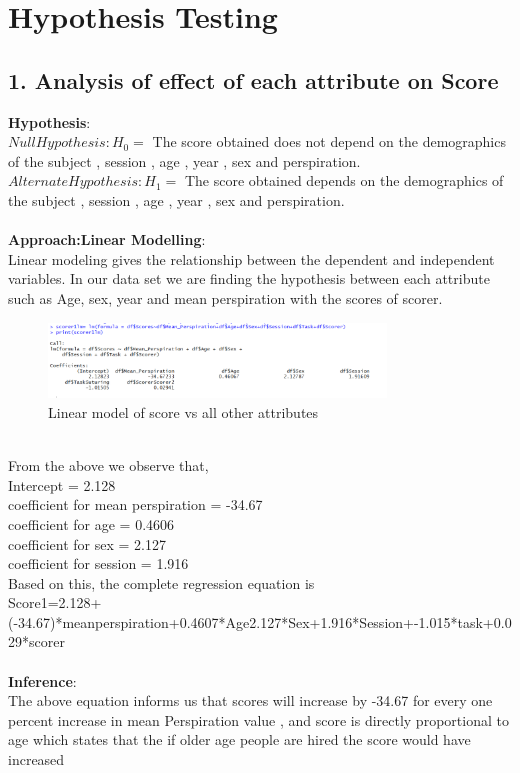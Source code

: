 \documentclass[12pt,epsf]{report}
\begin{document}
\section*{Hypothesis Testing}

\subsection*{1. Analysis of effect of each attribute on Score}

\textbf{Hypothesis}:\\
$Null Hypothesis : H_0 = $ The score obtained does not depend on the demographics of the subject , session , age , year , sex and perspiration.\\
$Alternate Hypothesis : H_1 = $ The score obtained  depends on the demographics of the subject , session , age , year , sex and perspiration.\\
\\
\textbf{Approach:Linear Modelling}:\\
Linear modeling gives the relationship between the dependent and independent variables. 
In our data set we are finding the hypothesis between each attribute such as Age, sex, year and mean perspiration with the scores of scorer.\\
\begin{figure}[!ht]
	\centering
	\includegraphics[width=0.8\textwidth]{Picture1}
	\caption{Linear model of score vs all other attributes}
	\centering
\end{figure}
\\
From the above we observe that,\\
Intercept = 2.128 \\
coefficient for mean perspiration = -34.67 \\
coefficient for age = 0.4606\\  
coefficient for sex = 2.127 \\
coefficient for session = 1.916 \\
Based on this, the complete regression equation is \\
Score1=2.128+(-34.67)*meanperspiration+0.4607*Age2.127*Sex+1.916*Session+-1.015*task+0.029*scorer\\
\\
\textbf{Inference}:\\
The above equation informs us that scores will increase by -34.67 for every one percent increase in mean Perspiration value , and score is directly proportional to age which states that the if older age people are hired the score would have increased\\
\\
\end{document}
